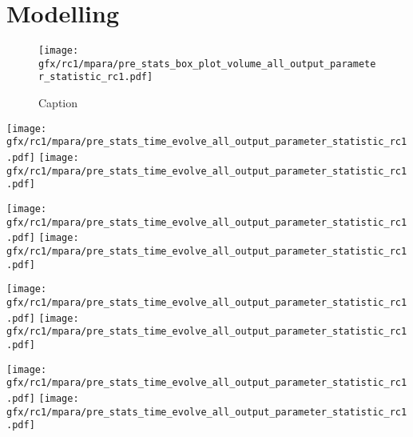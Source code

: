 \chapter{Modelling} %
\label{app:modelAnalysis}
%
%
% 
%
\begin{figure}[!h]
    \centering
    \texttt{[image: gfx/rc1/mpara/pre\_stats\_box\_plot\_volume\_all\_output\_parameter\_statistic\_rc1.pdf]}
    \caption{Caption}
    \label{app:appModelVolumeBoxPlot}
\end{figure}
%
%
% 
%
%
\setlength{\tikzwidth}{\textwidth}
\begin{sidewaysfigure}[!h]
\centering
\texttt{[image: gfx/rc1/mpara/pre\_stats\_time\_evolve\_all\_output\_parameter\_statistic\_rc1.pdf]}
\texttt{[image: gfx/rc1/mpara/pre\_stats\_time\_evolve\_all\_output\_parameter\_statistic\_rc1.pdf]}
\label{app:pste1}
\end{sidewaysfigure}
%
\begin{sidewaysfigure}[!h]
\centering
\texttt{[image: gfx/rc1/mpara/pre\_stats\_time\_evolve\_all\_output\_parameter\_statistic\_rc1.pdf]}
\texttt{[image: gfx/rc1/mpara/pre\_stats\_time\_evolve\_all\_output\_parameter\_statistic\_rc1.pdf]}
\label{app:pste2}
\end{sidewaysfigure}
%
\begin{sidewaysfigure}[!h]
\centering
\texttt{[image: gfx/rc1/mpara/pre\_stats\_time\_evolve\_all\_output\_parameter\_statistic\_rc1.pdf]}
\texttt{[image: gfx/rc1/mpara/pre\_stats\_time\_evolve\_all\_output\_parameter\_statistic\_rc1.pdf]}
\label{app:pste3}
\end{sidewaysfigure}
%
\begin{sidewaysfigure}[!h]
\centering
\texttt{[image: gfx/rc1/mpara/pre\_stats\_time\_evolve\_all\_output\_parameter\_statistic\_rc1.pdf]}
\texttt{[image: gfx/rc1/mpara/pre\_stats\_time\_evolve\_all\_output\_parameter\_statistic\_rc1.pdf]}
\label{app:pste4}
\end{sidewaysfigure}
